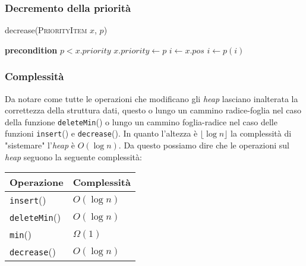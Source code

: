        \subsubsection{Decremento della priorità}
            \begin{algorithm}[H]
                \caption{decrease(\textsc{PriorityItem} $x$, \Int $p$)}
                \begin{algorithmic}
                    \State \textbf{precondition} $p < x.priority$
                    \State $x.priority \gets p$
                    \State \Int $i \gets x.pos$
                        \State {}
                        \State $i \gets p(i)$
                    \EndWhile
                \end{algorithmic}
            \end{algorithm}
        \subsubsection{Complessità}
            Da notare come tutte le operazioni che modificano gli \textit{heap} lasciano inalterata la correttezza della struttura dati, questo o lungo un cammino radice-foglia nel caso della funzione \texttt{deleteMin}() o lungo un cammino foglia-radice nel caso delle funzioni \texttt{insert}() e \texttt{decrease}(). In quanto l'altezza è $\lfloor\log n\rfloor$ la complessità di "sistemare" l'\textit{heap} è $O(\log n)$. Da questo possiamo dire che le operazioni sul \textit{heap} seguono la seguente complessità:
            \begin{table}[H]
                \begin{tabular}{|l|l|}
                    \hline
                    \textbf{Operazione} & \textbf{Complessità} \\
                    \hline
                    \texttt{insert}() & $O(\log n)$ \\
                    \hline
                    \texttt{deleteMin}() & $O(\log n)$ \\
                    \hline
                    \texttt{min}() & $\Omega(1)$ \\
                    \hline
                    \texttt{decrease}() & $O(\log n)$ \\
                    \hline
                \end{tabular}
            \end{table}